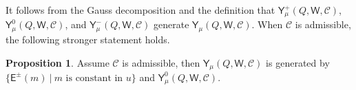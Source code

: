 \documentclass[10pt]{amsart}
\theoremstyle{definition}
\newtheorem{Proposition}[Theorem]{Proposition}
\numberwithin{equation}{section}
\newcommand{\bC}{\mathbb{C}}
\newcommand{\bZ}{\mathbb{Z}}
\newcommand{\cH}{\mathcal{H}}
\newcommand{\loc}{\mathrm{loc}}
\newcommand{\sW}{\mathsf{W}}
\newcommand{\End}{\operatorname{End}}
\newcommand{\Res}{\operatorname{Res}}
\newcommand{\Stab}{\operatorname{Stab}}
\newcommand{\str}{\operatorname{Str}}
\newcommand{\id}{\operatorname{id}}
\begin{document}




It follows from the Gauss decomposition and the definition that $\mathsf Y^+_\mu(Q,\sW,\mathcal C)$, $\mathsf Y^0_\mu(Q,\sW,\mathcal C)$, and $\mathsf Y^-_\mu(Q,\sW,\mathcal C)$ generate $\mathsf Y_\mu(Q,\sW,\mathcal C)$.  When $\mathcal C$ is admissible, 
the following stronger statement holds.

\begin{Proposition}\label{prop gen by deg 0 and Cartan}
Assume $\mathcal C$ is admissible, then $\mathsf Y_\mu(Q,\sW,\mathcal C)$ is generated by $\{\mathsf E^{\pm}(m)\:|\: m\text{ is constant in }u\}$ and $\mathsf Y^0_\mu(Q,\sW,\mathcal C)$.
\end{Proposition}
\end{document}
